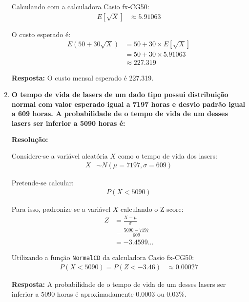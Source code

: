 \documentclass[a4paper,12pt]{article}
\begin{document}
\begin{enumerate}
\begin{mdframed}[backgroundcolor=gray!10, linewidth=0pt, innertopmargin=10pt, innerbottommargin=10pt]
  Calculando com a calculadora Casio fx-CG50:
  \begin{align*}
      E[\sqrt{X}] &\approx 5.91063
  \end{align*}

  O custo esperado é:
  \begin{align*}
      E(50 + 30\sqrt{X}) &= 50 + 30 \times E[\sqrt{X}] \\
      &= 50 + 30 \times 5.91063 \\
      &\approx 227.319
  \end{align*}

  \textbf{Resposta:} O custo mensal esperado é 227.319.
  \end{mdframed}

  \vspace{0.5cm}

  \item \textbf{O tempo de vida de lasers de um dado tipo possui distribuição normal com valor esperado igual a 7197 horas e desvio padrão igual a 609 horas. A probabilidade de o tempo de vida de um desses lasers ser inferior a 5090 horas é:}

  \vspace{0.3cm}

  \begin{mdframed}[backgroundcolor=gray!10, linewidth=0pt, innertopmargin=10pt, innerbottommargin=10pt]
  \textbf{Resolução:}
  
  Considere-se a variável aleatória $X$ como o tempo de vida dos lasers:
  \begin{align*}
      X &\sim N(\mu = 7197, \sigma = 609)
  \end{align*}

  Pretende-se calcular:
  \begin{align*}
      P(X < 5090)
  \end{align*}

  Para isso, padronize-se a variável $X$ calculando o Z-score:
  \begin{align*}
      Z &= \frac{X - \mu}{\sigma} \\
      &= \frac{5090 - 7197}{609} \\
      &= -3.4599...
  \end{align*}

  Utilizando a função \texttt{NormalCD} da calculadora Casio fx-CG50:
  \begin{align*}
      P(X < 5090) = P(Z < -3.46) &\approx 0.00027
  \end{align*}

  \textbf{Resposta:} A probabilidade de o tempo de vida de um desses lasers ser inferior a 5090 horas é aproximadamente 0.0003 ou 0.03\%.
  \end{mdframed}
\end{enumerate}
\end{document}
